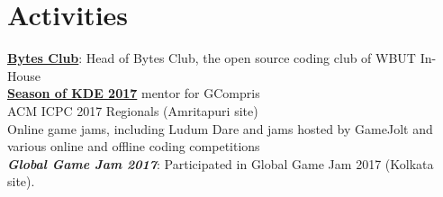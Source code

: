 \documentclass[]{rudra-resume-openfont}
\begin{document}
\begin{minipage}[t]{0.33\textwidth}
\section{Activities}
\renewcommand\refname{\vskip -1.5cm}
\textbullet{}  \textbf{\href{https://github.com/BytesClub}{Bytes Club}}: Head of Bytes Club, the open source coding club of WBUT In-House\\
\textbullet{}  \textbf{\href{season.kde.org/?q=program_home&prg=46}{Season of KDE 2017}} mentor for GCompris\\
\textbullet{} ACM ICPC 2017 Regionals (Amritapuri site)\\
\textbullet{} Online game jams, including Ludum Dare and jams hosted by GameJolt and various online and offline coding competitions\\
\textbullet{} \textit{\textbf{Global Game Jam 2017}}: Participated in Global Game Jam 2017 (Kolkata site).\\ 

%
%

\end{minipage} 
\hfill
\end{document}
